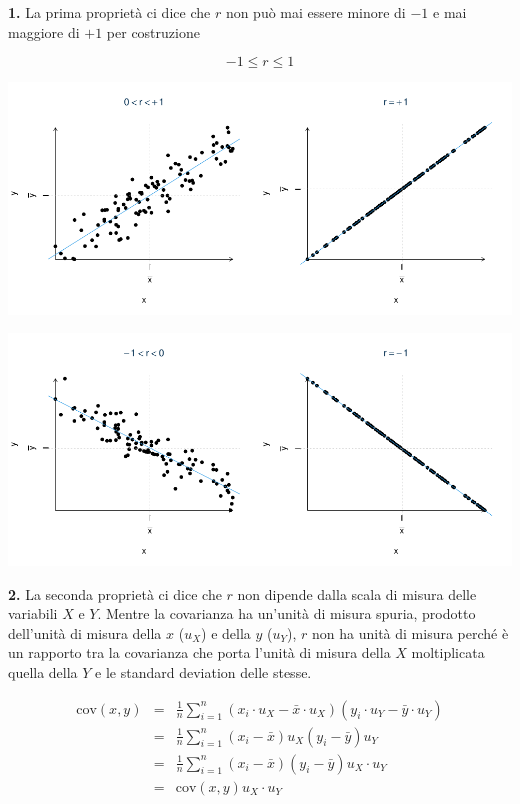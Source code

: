 \documentclass[
  11pt,
]{book}
\theoremstyle{mytheoremstyle}
\theoremstyle{mydefstyle}
\begin{document}
\textbf{1.} La prima proprietà ci dice che \(r\) non può mai essere minore di \(-1\) e mai
maggiore di \(+1\) per costruzione

\[-1 \le r \le 1\]

\begin{center}\includegraphics{Appunti_di_Statistica_2025_files/figure-latex/17-regressione-I-47-1} \end{center}

\begin{center}\includegraphics{Appunti_di_Statistica_2025_files/figure-latex/17-regressione-I-48-1} \end{center}

\textbf{2.} La seconda proprietà ci dice che \(r\) non dipende dalla scala di misura delle variabili
\(X\) e \(Y\). Mentre la covarianza ha un'unità di misura spuria, prodotto
dell'unità di misura della \(x\) (\(u_X\)) e della \(y\) (\(u_Y\)), \(r\) non
ha unità di misura perché è un rapporto tra la covarianza che porta l'unità di misura della \(X\)
moltiplicata quella della \(Y\) e le standard deviation delle stesse.

\begin{eqnarray*}
\text{cov}(x,y)&=&\frac 1 n\sum_{i=1}^n{(x_i\cdot u_X-\bar x\cdot u_X)(y_i\cdot u_Y-\bar y\cdot u_Y)}\\
  &=&\frac 1 n\sum_{i=1}^n{(x_i-\bar x)u_X(y_i-\bar y)u_Y}\\
  &=&\frac 1 n\sum_{i=1}^n{(x_i-\bar x)(y_i-\bar y)u_X\cdot u_Y}  \\
  &=&\text{cov}(x,y)u_X\cdot u_Y
\end{eqnarray*}
\end{document}
